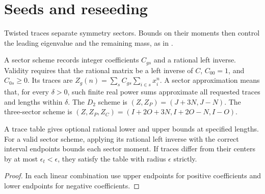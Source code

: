 \section{Seeds and reseeding}

Twisted traces separate symmetry sectors. Bounds on their moments then control the leading
eigenvalue and the remaining mass, as in \cite[Section 5]{OpenAIHaldane}.

\begin{definition}
  \label{def:seed-scheme}
  \leanok
  A sector scheme records integer coefficients \(C_{gs}\) and a rational left inverse.
  Validity requires that the rational matrix be a left inverse of \(C\), \(C_{00}=1\), and
  \(C_{0s}\ge0\).
  Its traces are \(Z_g(n)=\sum_s C_{gs}\sum_{i\in s}x_i^n\).
  A sector approximation means that, for every \(\delta>0\), such finite real power sums
  approximate all requested traces and lengths within \(\delta\).
  The \(D_2\) scheme is \((Z,Z_P)=(J+3N,J-N)\).
  The three-sector scheme is
  \((Z,Z_P,Z_C)=(I+2O+3N,I+2O-N,I-O)\).
\end{definition}

\begin{lemma}
  \label{lem:seed-table-inversion}
  \leanok
  A trace table gives optional rational lower and upper bounds at specified lengths.
  For a valid sector scheme, applying its rational left inverse with the correct interval
  endpoints bounds each sector moment.
  If traces differ from their centers by at most \(\epsilon_t<\epsilon\), they satisfy the
  table with radius \(\epsilon\) strictly.
\end{lemma}
\begin{proof}
  \leanok
  In each linear combination use upper endpoints for positive coefficients and lower endpoints
  for negative coefficients.
\end{proof}

